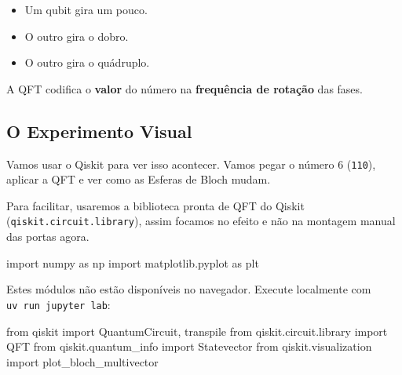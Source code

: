 \documentclass[
  brazilian,
]{report}
\newenvironment{Shaded}{\begin{snugshade}}{\end{snugshade}}
\newcommand{\ImportTok}[1]{\textcolor[rgb]{0.00,0.46,0.62}{#1}}
\newcommand{\NormalTok}[1]{\textcolor[rgb]{0.00,0.23,0.31}{#1}}
\providecommand{\tightlist}{%
  \setlength{\itemsep}{0pt}\setlength{\parskip}{0pt}}
\begin{document}
\begin{itemize}
\tightlist
\item
  Um qubit gira um pouco.
\item
  O outro gira o dobro.
\item
  O outro gira o quádruplo.
\end{itemize}

A QFT codifica o \textbf{valor} do número na \textbf{frequência de
rotação} das fases.

\subsection{O Experimento Visual}\label{o-experimento-visual}

Vamos usar o Qiskit para ver isso acontecer. Vamos pegar o número 6
(\texttt{110}), aplicar a QFT e ver como as Esferas de Bloch mudam.

Para facilitar, usaremos a biblioteca pronta de QFT do Qiskit
(\texttt{qiskit.circuit.library}), assim focamos no efeito e não na
montagem manual das portas agora.

\begin{Shaded}
\begin{Highlighting}[]
\NormalTok{import numpy as np}
\NormalTok{import matplotlib.pyplot as plt}
\end{Highlighting}
\end{Shaded}

\begin{tcolorbox}[enhanced jigsaw, arc=.35mm, bottomrule=.15mm, bottomtitle=1mm, breakable, colback=white, colbacktitle=quarto-callout-note-color!10!white, colframe=quarto-callout-note-color-frame, coltitle=black, left=2mm, leftrule=.75mm, opacityback=0, opacitybacktitle=0.6, rightrule=.15mm, title=\textcolor{quarto-callout-note-color}{\faInfo}\hspace{0.5em}{🔒 Imports do Qiskit (requerem execução local)}, titlerule=0mm, toprule=.15mm, toptitle=1mm]

Estes módulos não estão disponíveis no navegador. Execute localmente com
\texttt{uv\ run\ jupyter\ lab}:

\begin{Shaded}
\begin{Highlighting}[]
\ImportTok{from}\NormalTok{ qiskit }\ImportTok{import}\NormalTok{ QuantumCircuit, transpile}
\ImportTok{from}\NormalTok{ qiskit.circuit.library }\ImportTok{import}\NormalTok{ QFT}
\ImportTok{from}\NormalTok{ qiskit.quantum\_info }\ImportTok{import}\NormalTok{ Statevector}
\ImportTok{from}\NormalTok{ qiskit.visualization }\ImportTok{import}\NormalTok{ plot\_bloch\_multivector}
\end{Highlighting}
\end{Shaded}

\end{tcolorbox}
\end{document}
